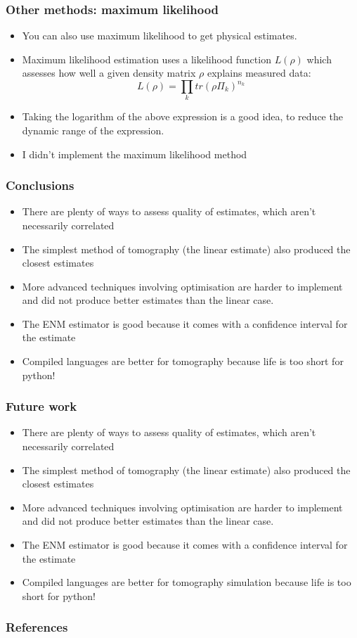 \documentclass{beamer}
\begin{document}
\begin{frame}
  \frametitle{Other methods: maximum likelihood}
  \begin{itemize}
  \item You can also use maximum likelihood to get physical estimates.
  \item Maximum likelihood estimation uses a likelihood function $L(\rho)$ which assesses how well a given density matrix $\rho$ explains measured data: $$L(\rho) = \prod_k tr(\rho \Pi_k)^{n_k}$$
  \item Taking the logarithm of the above expression is a good idea, to reduce the dynamic range of the expression.
    \item I didn't implement the maximum likelihood method
  \end{itemize}
\end{frame}

\begin{frame}
\frametitle{Conclusions}
\begin{itemize}
\item There are plenty of ways to assess quality of estimates, which aren't necessarily correlated
\item The simplest method of tomography (the linear estimate) also produced the closest estimates
\item More advanced techniques involving optimisation are harder to implement and did not produce better estimates than the linear case.
\item The ENM estimator is good because it comes with a confidence interval for the estimate
\item Compiled languages are better for tomography because life is too short for python!
\end{itemize}
\end{frame}

\begin{frame}
\frametitle{Future work}
\begin{itemize}
\item There are plenty of ways to assess quality of estimates, which aren't necessarily correlated
\item The simplest method of tomography (the linear estimate) also produced the closest estimates
\item More advanced techniques involving optimisation are harder to implement and did not produce better estimates than the linear case.
\item The ENM estimator is good because it comes with a confidence interval for the estimate
\item Compiled languages are better for tomography simulation because life is too short for python!
\end{itemize}
\end{frame}

\begin{frame}
\frametitle{References}
\printbibliography
\end{frame}
\end{document}
